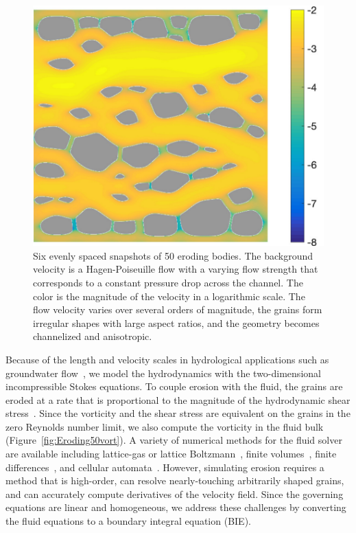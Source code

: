 \documentclass[preprint,10pt]{elsarticle}
\begin{document}
\begin{figure}[H]
\begin{center}
\includegraphics[height = 0.31 \textwidth]{./figs/vel_log_50b400}
\caption{\label{fig:Eroding50vel} Six evenly spaced snapshots of 50
eroding bodies.  The background velocity is a Hagen-Poiseuille flow with
a varying flow strength that corresponds to a constant pressure drop
across the channel. The color is the magnitude of the velocity in a
logarithmic scale. The flow velocity varies over several orders of
magnitude, the grains form irregular shapes with large aspect ratios,
and the geometry becomes channelized and anisotropic.}
\end{center}
\end{figure}

Because of the length and velocity scales in hydrological applications
such as groundwater flow~\cite{bea1972}, we model the hydrodynamics with
the two-dimensional incompressible Stokes equations.  To couple erosion
with the fluid, the grains are eroded at a rate that is proportional to
the magnitude of the hydrodynamic shear stress~\cite{wan-fel2004,
ris-moo-chi-she-zha2012, par-izu2000}.  Since the vorticity and the
shear stress are equivalent on the grains in the zero Reynolds number
limit, we also compute the vorticity in the fluid bulk
(Figure~\ref{fig:Eroding50vort}).  A variety of numerical methods for
the fluid solver are available including lattice-gas or lattice
Boltzmann~\cite{kop-kat-tim1996, dar-mcc1998}, finite
volumes~\cite{suo-liu-gan2019, den-ica-hid2018,
sie-ili-pri-riv-gua2019}, finite differences~\cite{leb-ded-dav-bou2007,
knu-car2005}, and cellular automata~\cite{rot1988}.  However, simulating
erosion requires a method that is high-order, can resolve
nearly-touching arbitrarily shaped grains, and can accurately compute
derivatives of the velocity field.  Since the governing equations are
linear and homogeneous, we address these challenges by converting the
fluid equations to a boundary integral equation (BIE).
\end{document}
